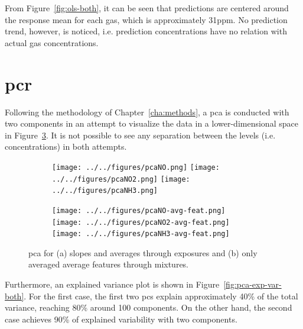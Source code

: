 From Figure~\ref{fig:ols-both}, it can be seen that predictions are centered around the response mean for each gas, which is approximately 31\acrshort{ppm}. No prediction trend, however, is noticed, i.e. prediction concentrations have no relation with actual gas concentrations.


\clearpage
\section{\acrlong{pcr}}
\label{sec:results-pcr}

Following the methodology of Chapter~\ref{cha:methods}, a \acrshort{pca} is conducted with two components in an attempt to visualize the data in a lower-dimensional space in Figure~\ref{fig:pca-both}.  It is not possible to see any separation between the levels (i.e. concentrations) in both attempts.

\begin{figure}[!htb]
	\centering
	
	\begin{subfigure}[b]{1\textwidth}
	\texttt{[image: ../../figures/pcaNO.png]}
	\hfill
	\texttt{[image: ../../figures/pcaNO2.png]}
	\hfill
	\texttt{[image: ../../figures/pcaNH3.png]}
	\caption{}
	\label{fig:pca}
	\end{subfigure}
	
	\begin{subfigure}[b]{1\textwidth}
	\texttt{[image: ../../figures/pcaNO-avg-feat.png]}
	\hfill
	\texttt{[image: ../../figures/pcaNO2-avg-feat.png]}
	\hfill
	\texttt{[image: ../../figures/pcaNH3-avg-feat.png]}
	\caption{}
	\label{fig:pca-avg-only}
	\end{subfigure}
	
	\caption{\acrshort{pca} for (a) slopes and averages through exposures and (b) only averaged average features through mixtures.}
	\label{fig:pca-both}
\end{figure}

Furthermore, an explained variance plot is shown in Figure~\ref{fig:pca-exp-var-both}. For the first case, the first two \acrshort{pc}s explain approximately 40\% of the total variance, reaching 80\% around 100 components. On the other hand, the second case achieves 90\% of explained variability with two components.

